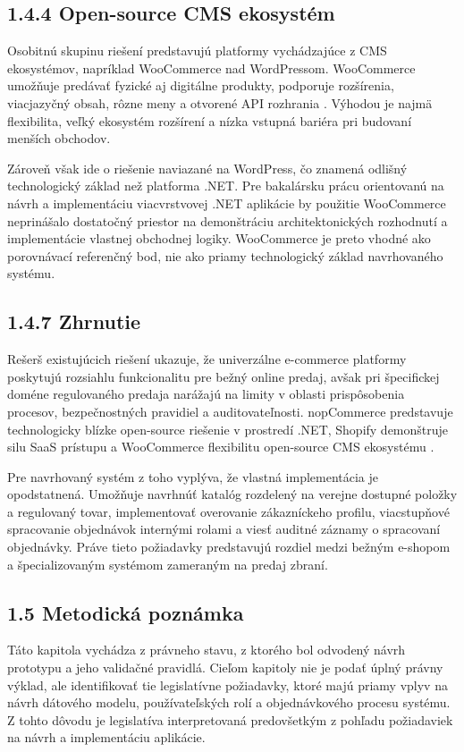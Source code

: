\subsection*{1.4.4 Open-source CMS ekosystém}
Osobitnú skupinu riešení predstavujú platformy vychádzajúce z CMS ekosystémov, napríklad WooCommerce nad WordPressom. WooCommerce umožňuje predávať fyzické aj digitálne produkty, podporuje rozšírenia, viacjazyčný obsah, rôzne meny a otvorené API rozhrania \cite{woocommerce_features}. Výhodou je najmä flexibilita, veľký ekosystém rozšírení a nízka vstupná bariéra pri budovaní menších obchodov.

Zároveň však ide o riešenie naviazané na WordPress, čo znamená odlišný technologický základ než platforma .NET. Pre bakalársku prácu orientovanú na návrh a implementáciu viacvrstvovej .NET aplikácie by použitie WooCommerce neprinášalo dostatočný priestor na demonštráciu architektonických rozhodnutí a implementácie vlastnej obchodnej logiky. WooCommerce je preto vhodné ako porovnávací referenčný bod, nie ako priamy technologický základ navrhovaného systému.

\subsection*{1.4.7 Zhrnutie}
Rešerš existujúcich riešení ukazuje, že univerzálne e-commerce platformy poskytujú rozsiahlu funkcionalitu pre bežný online predaj, avšak pri špecifickej doméne regulovaného predaja narážajú na limity v oblasti prispôsobenia procesov, bezpečnostných pravidiel a auditovateľnosti. nopCommerce predstavuje technologicky blízke open-source riešenie v prostredí .NET, Shopify demonštruje silu SaaS prístupu a WooCommerce flexibilitu open-source CMS ekosystému \cite{nopcommerce_features,shopify_online_store,woocommerce_features}.

Pre navrhovaný systém z toho vyplýva, že vlastná implementácia je opodstatnená. Umožňuje navrhnúť katalóg rozdelený na verejne dostupné položky a regulovaný tovar, implementovať overovanie zákazníckeho profilu, viacstupňové spracovanie objednávok internými rolami a viesť auditné záznamy o spracovaní objednávky. Práve tieto požiadavky predstavujú rozdiel medzi bežným e-shopom a špecializovaným systémom zameraným na predaj zbraní.

\subsection*{1.5 Metodická poznámka}
Táto kapitola vychádza z právneho stavu, z ktorého bol odvodený návrh prototypu a jeho validačné pravidlá. Cieľom kapitoly nie je podať úplný právny výklad, ale identifikovať tie legislatívne požiadavky, ktoré majú priamy vplyv na návrh dátového modelu, používateľských rolí a objednávkového procesu systému. Z tohto dôvodu je legislatíva interpretovaná predovšetkým z pohľadu požiadaviek na návrh a implementáciu aplikácie.

